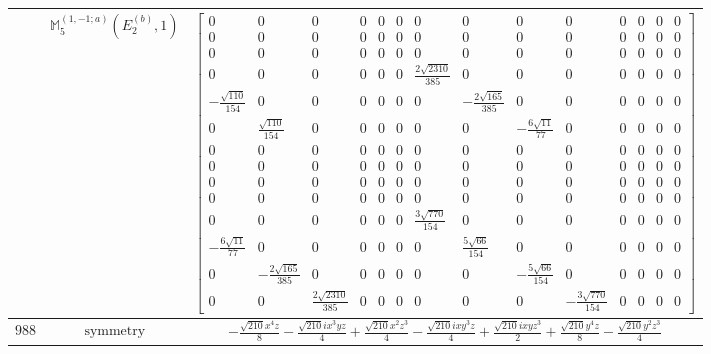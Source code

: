 \documentclass[fleqn,8pt,landscape]{jsarticle}
\begin{document}
\begin{longtable}{ccc}
$  $ & $ \mathbb{M}_{5}^{(1,-1;a)}(E_{2}^{(b)},1) $ & $ \begin{bmatrix} 0 & 0 & 0 & 0 & 0 & 0 & 0 & 0 & 0 & 0 & 0 & 0 & 0 & 0 \\ 0 & 0 & 0 & 0 & 0 & 0 & 0 & 0 & 0 & 0 & 0 & 0 & 0 & 0 \\ 0 & 0 & 0 & 0 & 0 & 0 & 0 & 0 & 0 & 0 & 0 & 0 & 0 & 0 \\ 0 & 0 & 0 & 0 & 0 & 0 & \frac{2 \sqrt{2310}}{385} & 0 & 0 & 0 & 0 & 0 & 0 & 0 \\ - \frac{\sqrt{110}}{154} & 0 & 0 & 0 & 0 & 0 & 0 & - \frac{2 \sqrt{165}}{385} & 0 & 0 & 0 & 0 & 0 & 0 \\ 0 & \frac{\sqrt{110}}{154} & 0 & 0 & 0 & 0 & 0 & 0 & - \frac{6 \sqrt{11}}{77} & 0 & 0 & 0 & 0 & 0 \\ 0 & 0 & 0 & 0 & 0 & 0 & 0 & 0 & 0 & 0 & 0 & 0 & 0 & 0 \\ 0 & 0 & 0 & 0 & 0 & 0 & 0 & 0 & 0 & 0 & 0 & 0 & 0 & 0 \\ 0 & 0 & 0 & 0 & 0 & 0 & 0 & 0 & 0 & 0 & 0 & 0 & 0 & 0 \\ 0 & 0 & 0 & 0 & 0 & 0 & 0 & 0 & 0 & 0 & 0 & 0 & 0 & 0 \\ 0 & 0 & 0 & 0 & 0 & 0 & \frac{3 \sqrt{770}}{154} & 0 & 0 & 0 & 0 & 0 & 0 & 0 \\ - \frac{6 \sqrt{11}}{77} & 0 & 0 & 0 & 0 & 0 & 0 & \frac{5 \sqrt{66}}{154} & 0 & 0 & 0 & 0 & 0 & 0 \\ 0 & - \frac{2 \sqrt{165}}{385} & 0 & 0 & 0 & 0 & 0 & 0 & - \frac{5 \sqrt{66}}{154} & 0 & 0 & 0 & 0 & 0 \\ 0 & 0 & \frac{2 \sqrt{2310}}{385} & 0 & 0 & 0 & 0 & 0 & 0 & - \frac{3 \sqrt{770}}{154} & 0 & 0 & 0 & 0 \end{bmatrix} $ \\ \hline
$ 988 $ & $ \text{symmetry} $ & $ - \frac{\sqrt{210} x^{4} z}{8} - \frac{\sqrt{210} i x^{3} y z}{4} + \frac{\sqrt{210} x^{2} z^{3}}{4} - \frac{\sqrt{210} i x y^{3} z}{4} + \frac{\sqrt{210} i x y z^{3}}{2} + \frac{\sqrt{210} y^{4} z}{8} - \frac{\sqrt{210} y^{2} z^{3}}{4} $ \\

\end{longtable}
\end{document}
